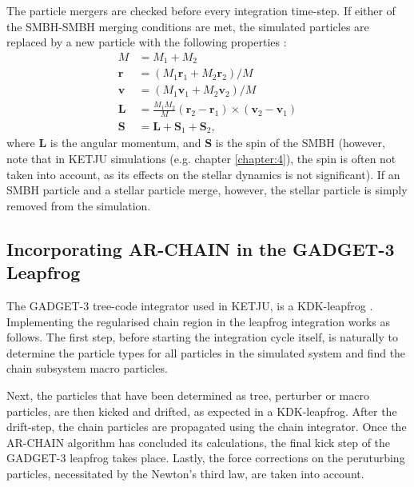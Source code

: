 \documentclass[english, twoside]{HYgradu}
\begin{document}
The particle mergers are checked before every integration time-step. If either of the SMBH-SMBH merging conditions are met, the simulated particles are replaced by a new particle with the following properties \citep{Rantala2017KETJU}:
\begin{equation}
\begin{split}
M &= M_1 + M_2 \\
\mathbf{r} &= (M_1 \mathbf{r}_1 + M_2 \mathbf{r}_2) / M \\
\mathbf{v} &= (M_1 \mathbf{v}_1 + M_2 \mathbf{v}_2) / M \\
\mathbf{L} &= \frac{M_1 M_2}{M} (\mathbf{r}_2 - \mathbf{r}_1) \times (\mathbf{v}_2 - \mathbf{v}_1) \\
\mathbf{S} &= \mathbf{L} + \mathbf{S}_1 + \mathbf{S}_2,
\end{split}
\end{equation}
where $\mathbf{L}$ is the angular momentum, and $\mathbf{S}$ is the spin of the SMBH (however, note that in KETJU simulations (e.g. chapter \ref{chapter:4}), the spin is often not taken into account, as its effects on the stellar dynamics is not significant). If an SMBH particle and a stellar particle merge, however, the stellar particle is simply removed from the simulation.

\subsection{Incorporating AR-CHAIN in the GADGET-3 Leapfrog} \label{section:archain_plus_gadget}

The GADGET-3 tree-code integrator used in KETJU, is a KDK-leapfrog \citep{Springel2005}. Implementing the regularised chain region in the leapfrog integration works as follows. The first step, before starting the integration cycle itself, is naturally to determine the particle types for all particles in the simulated system and find the chain subsystem macro particles. 

Next, the particles that have been determined as tree, perturber or macro particles, are then kicked and drifted, as expected in a KDK-leapfrog. After the drift-step, the chain particles are propagated using the chain integrator. Once the AR-CHAIN algorithm has concluded its calculations, the final kick step of the GADGET-3 leapfrog takes place. Lastly, the force corrections on the peruturbing particles, necessitated by the Newton's third law, are taken into account. 
\end{document}
